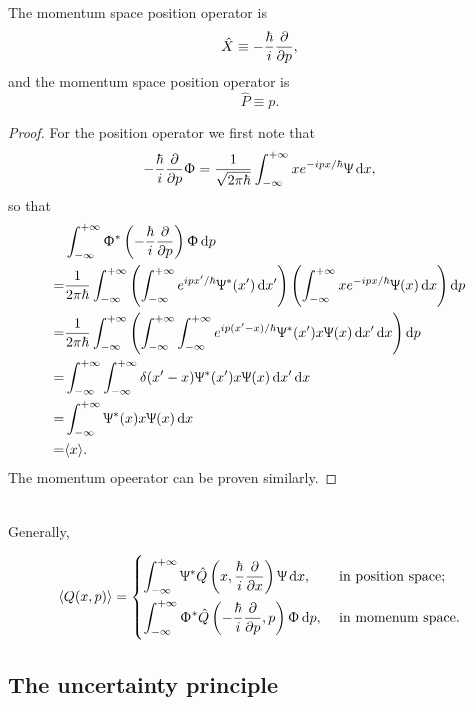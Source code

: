 \begin{coro}
The momentum space position operator is
\begin{equation}
\hat{X}\equiv-\frac{\hbar}{i}\diffp{}{p}, 
\end{equation}
and the momentum space position operator is 
\begin{equation}
\hat{P}\equiv p.
\end{equation}
\end{coro}
\begin{proof}
For the position operator we first note that
\begin{equation}
-\frac{\hbar}{i}\diffp*{\uph}p=\frac{1}{\sqrt{2\pi\hbar}}\intinf xe^{-ipx/\hbar}\ups\dx, 
\end{equation}
so that
\begin{subequations}
\begin{align}
&\intinf\uph^*\lf(-\frac{\hbar}{i}\diffp{}{p} \rt)\uph\dif p\\
=&\frac{1}{2\pi\hbar}\intinf \lf(\intinf e^{ipx'/\hbar}\ups^*(x')\dif x' \rt)\lf(\intinf xe^{-ipx/\hbar}\ups(x)\dx \rt)\dif p\\
=&\frac{1}{2\pi\hbar}\intinf \lf(\intinf\intinf e^{ip(x'-x)/\hbar}\ups^*(x')x\ups(x)\dif x'\dx \rt)\dif p\\
=&\intinf\intinf\delta(x'-x)\ups^*(x')x\ups(x)\dif x'\dx\\
=&\intinf\ups^*(x)x\ups(x)\dx\\
=&\lgl x\rgl.
\end{align}
\end{subequations}
The momentum opeerator can be proven similarly. 
\end{proof}
\begin{thrm}
\ \\
Generally, 
\begin{singlespace}
\begin{equation}
\lgl Q(x,p)\rgl=
\begin{dcases}
	\intinf\ups^*\hat{Q}\lf(x,\frac{\hbar}{i}\diffp{}{x} \rt)\ups\dx,\ &\text{in position space;}\\
	\intinf\uph^*\hat{Q}\lf(-\frac{\hbar}{i}\diffp{}{p},p \rt)\uph\dif p,\ &\text{in momenum space.}
\end{dcases}
\end{equation}
\end{singlespace}
\end{thrm}
\subsection{The uncertainty principle}
